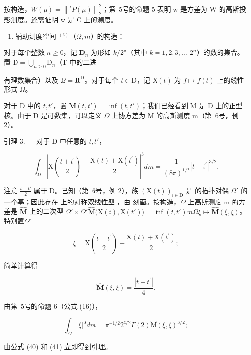 按构造，\(W(\mu) = \left\|^{t} P(\mu) \right\|_{2}^{2}\)；第~5号的命题 5 表明 w 是方差为 W 的高斯投影测度。还需证明 w 是 C 上的测度。

\begin{enumerate}
\def\labelenumi{\Alph{enumi})}
\tightlist
\item
  辅助测度空间 \(^{(2)}\)（\(\Omega, m\)）的构造：
\end{enumerate}

对于每个整数 \(n \geqslant 0\)，记 \(\mathbf{D}_n\) 为形如 \(k / 2^n\)（其中 \(k = 1, 2, 3, \ldots, 2^n\)）的数的集合。置 \(\mathrm{D} = \bigcup_{n \geqslant 0} \mathrm{D}_n\)（T 中的二进

有理数集合）以及 \(\Omega = \mathbf{R}^{\mathrm{D}}\)。对于每个 \(t \in \mathrm{D}\)，记 \(\mathrm{X}(t)\) 为 \(f \mapsto f(t)\) 上的线性形式 \(\Omega\)。

对于 D 中的 \(t, t'\)，置 \(\mathbf{M}(t, t') = \inf(t, t')\)；我们已经看到 M 是 D 上的正型核。由于 D 是可数集，可以定义 \(\Omega\) 上协方差为 M 的高斯测度 m（第~6号，例 2）。

引理 3. --- 对于 D 中任意的 \(t, t'\)，

\[
\int_ {\Omega} \left| \mathrm{X} \left(\frac {t + t ^ {\prime}}{2}\right) - \frac {\mathrm{X} (t) + \mathrm{X} \left(t ^ {\prime}\right)}{2} \right| ^ {3} d m = \frac {1}{(8 \pi) ^ {1 / 2}} | t - t ^ {\prime} | ^ {3 / 2}.\tag{38}
\]

注意 \(\frac{t + t'}{2}\) 属于 D。已知（第~6号，例 2），族 \(\left(\mathrm{X}(t)\right)_{t\in \mathrm{D}}\) 是  的拓扑对偶 \(\Omega'\) 的一个基；因此存在  上的对称双线性型 ，由  刻画。按构造，\(\Omega\) 上高斯测度 m 的方差是 \(\widehat{\mathbf{M}}\) 上的二次型 \(\Omega' \times \Omega'\)\(\widehat{\mathbf{M}}\big(\mathrm{X}(t),\mathrm{X}(t')\big) = \inf(t,t')\)\(m\)\(\Omega\)\(\xi \mapsto \widehat{\mathbf{M}}(\xi ,\xi)\)。特别置\(\Omega'\)

\[
\xi = \mathrm{X} \left(\frac {t + t ^ {\prime}}{2}\right) - \frac {\mathrm{X} (t) + \mathrm{X} (t ^ {\prime})}{2};\tag{39}
\]

简单计算得

\[
\widehat {\mathbf {M}} (\xi , \xi) = \frac {| t - t ^ {\prime} |}{4}.\tag{40}
\]

由第~5号的命题 6（公式 (16)），

\[
\int_ {\Omega} | \xi | ^ {3} d m = \pi^ {- 1 / 2} 2 ^ {3 / 2} \Gamma (2) \widehat {\mathrm{M}} (\xi , \xi) ^ {3 / 2};\tag{41}
\]

由公式 (40) 和 (41) 立即得到引理。

